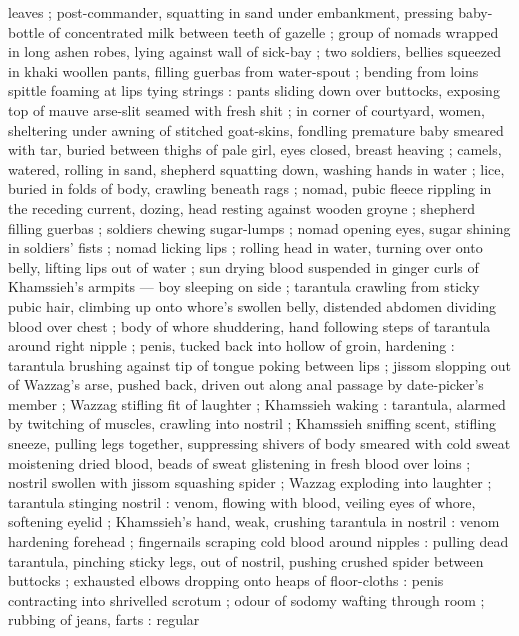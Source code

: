leaves ; post-commander, squatting in sand under embankment, pressing baby-bottle of concentrated milk between teeth of gazelle ; group of nomads wrapped in long ashen robes, lying against wall of sick-bay ; two soldiers, bellies squeezed in khaki woollen pants, filling guerbas from water-spout ; bending from loins spittle foaming at lips tying strings : pants sliding down over buttocks, exposing top of mauve arse-slit seamed with fresh shit ; in corner of courtyard, women, sheltering under awning of stitched goat-skins, fondling premature baby smeared with tar, buried between thighs of pale girl, eyes closed, breast heaving ; camels, watered, rolling in sand, shepherd squatting down, washing hands in water ; lice, buried in folds of body, crawling beneath rags ; nomad, pubic fleece rippling in the receding current, dozing, head resting against wooden groyne ; shepherd filling guerbas ; soldiers chewing sugar-lumps ; nomad opening eyes, sugar shining in soldiers' fists ; nomad licking lips ; rolling head in water, turning over onto belly, lifting lips out of water{\td}  ; sun drying blood suspended in ginger curls of Khamssieh's armpits --- boy sleeping on side ; tarantula crawling from sticky pubic hair, climbing up onto whore's swollen belly, distended abdomen dividing blood over chest ; body of whore shuddering, hand following steps of tarantula around right nipple  ; penis, tucked back into hollow of groin, hardening : tarantula brushing against tip of tongue poking between lips ; jissom slopping out of Wazzag's arse, pushed back, driven out along anal passage by date-picker's member ; Wazzag stifling fit of laughter ; Khamssieh waking : tarantula, alarmed by twitching of muscles, crawling into nostril ; Khamssieh sniffing scent, stifling sneeze, pulling legs together, suppressing shivers of body smeared with cold sweat moistening dried blood, beads of sweat glistening in fresh blood over loins ; nostril swollen with jissom squashing spider ; Wazzag exploding into laughter ; tarantula stinging nostril : venom, flowing with blood, veiling eyes of whore, softening eyelid ; Khamssieh's hand, weak, crushing tarantula in nostril : venom hardening forehead ; fingernails scraping cold blood %
around nipples : pulling dead tarantula, pinching sticky legs, out of nostril, pushing crushed
spider between buttocks ; exhausted elbows dropping onto heaps of floor-cloths : penis contracting
into shrivelled scrotum ; odour of sodomy wafting through room ; rubbing of jeans, farts : regular
